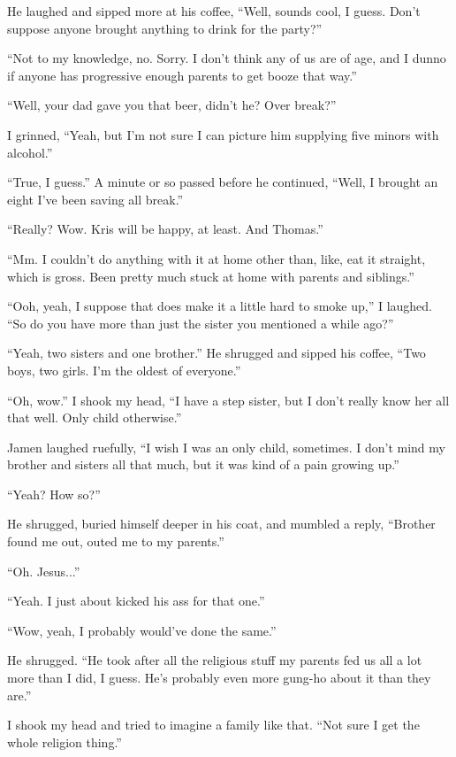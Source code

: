 He laughed and sipped more at his coffee, ``Well, sounds cool, I guess.  Don't suppose anyone brought anything to drink for the party?''

``Not to my knowledge, no.  Sorry.  I don't think any of us are of age, and I dunno if anyone has progressive enough parents to get booze that way.''

``Well, your dad gave you that beer, didn't he?  Over break?''

I grinned, ``Yeah, but I'm not sure I can picture him supplying five minors with alcohol.''

``True, I guess.''  A minute or so passed before he continued, ``Well, I brought an eight I've been saving all break.''

``Really?  Wow.  Kris will be happy, at least.  And Thomas.''

``Mm.  I couldn't do anything with it at home other than, like, eat it straight, which is gross.  Been pretty much stuck at home with parents and siblings.''

``Ooh, yeah, I suppose that does make it a little hard to smoke up,'' I laughed.  ``So do you have more than just the sister you mentioned a while ago?''

``Yeah, two sisters and one brother.''  He shrugged and sipped his coffee, ``Two boys, two girls.  I'm the oldest of everyone.''

``Oh, wow.''  I shook my head, ``I have a step sister, but I don't really know her all that well.  Only child otherwise.''

Jamen laughed ruefully, ``I wish I was an only child, sometimes.  I don't mind my brother and sisters all that much, but it was kind of a pain growing up.''

``Yeah?  How so?''

He shrugged, buried himself deeper in his coat, and mumbled a reply, ``Brother found me out, outed me to my parents.''

``Oh.  Jesus...''

``Yeah.  I just about kicked his ass for that one.''

``Wow, yeah, I probably would've done the same.''

He shrugged.  ``He took after all the religious stuff my parents fed us all a lot more than I did, I guess.  He's probably even more gung-ho about it than they are.''

I shook my head and tried to imagine a family like that.  ``Not sure I get the whole religion thing.''

